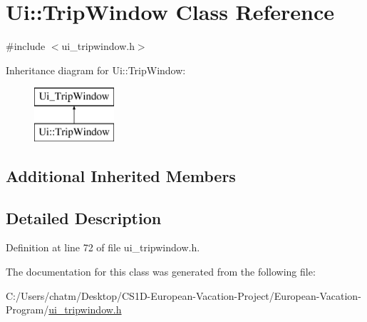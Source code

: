 \hypertarget{class_ui_1_1_trip_window}{}\section{Ui\+::Trip\+Window Class Reference}
\label{class_ui_1_1_trip_window}


{\ttfamily \#include $<$ui\+\_\+tripwindow.\+h$>$}

Inheritance diagram for Ui\+::Trip\+Window\+:\begin{figure}[H]
\begin{center}
\leavevmode
\includegraphics[height=2.000000cm]{class_ui_1_1_trip_window}
\end{center}
\end{figure}
\subsection*{Additional Inherited Members}


\subsection{Detailed Description}


Definition at line 72 of file ui\+\_\+tripwindow.\+h.



The documentation for this class was generated from the following file\+:\begin{DoxyCompactItemize}
\item 
C\+:/\+Users/chatm/\+Desktop/\+C\+S1\+D-\/\+European-\/\+Vacation-\/\+Project/\+European-\/\+Vacation-\/\+Program/\mbox{\hyperlink{ui__tripwindow_8h}{ui\+\_\+tripwindow.\+h}}\end{DoxyCompactItemize}
